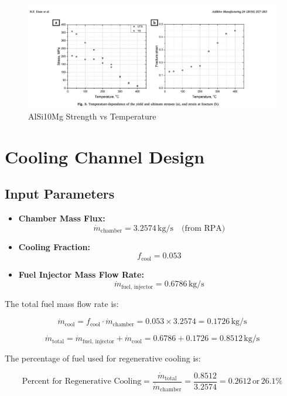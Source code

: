 \begin{figure}[H]
    \centering
    \includegraphics[width=\linewidth]{Images/aluminumstrength.png}
    \caption{AlSi10Mg Strength vs Temperature}
    \label{fig:aluminum_strength}
\end{figure}




\section{Cooling Channel Design}
\subsection{Input Parameters}
\begin{itemize}
    \item \textbf{Chamber Mass Flux:} 
    \[
    \dot{m}_{\text{chamber}} = 3.2574 \, \si{\kilo\gram\per\second} \quad \text{(from RPA)}
    \]
    \item \textbf{Cooling Fraction:} 
    \[
    f_{\text{cool}} = 0.053
    \]
    \item \textbf{Fuel Injector Mass Flow Rate:} 
    \[
    \dot{m}_{\text{fuel, injector}} = 0.6786 \, \si{\kilo\gram\per\second}
    \]
\end{itemize}

The total fuel mass flow rate is:

\[
\dot{m}_{\text{cool}} = f_{\text{cool}} \cdot \dot{m}_{\text{chamber}} = 0.053 \times 3.2574 = 0.1726 \, \si{\kilo\gram\per\second}
\]

\[
\dot{m}_{\text{total}} = \dot{m}_{\text{fuel, injector}} + \dot{m}_{\text{cool}} = 0.6786 + 0.1726 = 0.8512 \, \si{\kilo\gram\per\second}
\]

The percentage of fuel used for regenerative cooling is:

\[
\text{Percent for Regenerative Cooling} = \frac{\dot{m}_{\text{total}}}{\dot{m}_{\text{chamber}}} = \frac{0.8512}{3.2574} = 0.2612 \, \text{or} \, 26.1\%
\]


